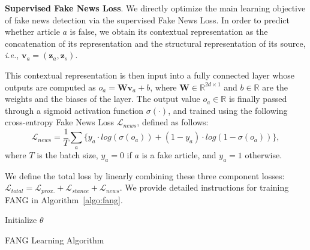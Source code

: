 \documentclass[sigconf]{acmart}
\theoremstyle{definition}
\theoremstyle{hypothesis}
\begin{document}
\textbf{Supervised Fake News Loss}. We directly optimize the main learning objective of fake news detection via the supervised Fake News Loss. In order to predict whether article $a$ is false, we obtain its contextual representation as the concatenation of its representation and the structural representation of its source, {\it i.e.}, $\boldsymbol{v}_a = (\boldsymbol{z}_a, \boldsymbol{z}_s)$. 

This contextual representation is then input into a fully connected layer whose outputs are computed as $o_a = \mathbf{W}\boldsymbol{v}_a+b$, where $\boldsymbol{W}\in \mathbb{R}^{2d\times 1}$ and $b\in \mathbb{R}$ are the weights and the biases of the layer. The output value $o_a \in \mathbb{R}$
is finally passed through a sigmoid activation function $\sigma(\cdot)$, and trained using the following cross-entropy Fake News Loss $\mathcal{L}_{news}$, defined as follows:   
\begin{equation}\label{eq:news_loss}
    \mathcal{L}_{news}=\frac{1}{T}\sum_a\{{y}_{a} \cdot log(\sigma({o}_{a}))+(1-{y}_{a})\cdot log(1-\sigma({o}_{a}))\}, 
\end{equation}
where $T$ is the batch size, $y_{a}=0$ if $a$ is a fake article, and $y_{a}=1$ otherwise.

We define the total loss by linearly combining these three component losses: $\mathcal{L}_{total} = \mathcal{L}_{prox.} + \mathcal{L}_{stance} + \mathcal{L}_{news}$. We provide detailed instructions for training FANG in Algorithm~\ref{algo:fang}.

\begin{algorithm}[t]
\SetAlgoLined
{}
 Initialize $\theta$\;
 \Return{$\theta$}
 \caption{FANG Learning Algorithm}\label{algo:fang}
\end{algorithm}
\end{document}
